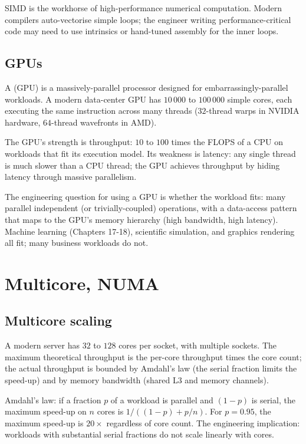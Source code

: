 SIMD is the workhorse of high-performance numerical computation. Modern compilers auto-vectorise simple loops; the engineer writing performance-critical code may need to use intrinsics or hand-tuned assembly for the inner loops.

\subsection{GPUs}

A  (GPU) is a massively-parallel processor designed for embarrassingly-parallel workloads. A modern data-center GPU has $10\,000$ to $100\,000$ simple cores, each executing the same instruction across many threads ($32$-thread warps in NVIDIA hardware, $64$-thread wavefronts in AMD).

The GPU's strength is throughput: $10$ to $100$ times the FLOPS of a CPU on workloads that fit its execution model. Its weakness is latency: any single thread is much slower than a CPU thread; the GPU achieves throughput by hiding latency through massive parallelism.

The engineering question for using a GPU is whether the workload fits: many parallel independent (or trivially-coupled) operations, with a data-access pattern that maps to the GPU's memory hierarchy (high bandwidth, high latency). Machine learning (Chapters 17-18), scientific simulation, and graphics rendering all fit; many business workloads do not.

\section{Multicore, NUMA}

\subsection{Multicore scaling}

A modern server has $32$ to $128$ cores per socket, with multiple sockets. The maximum theoretical throughput is the per-core throughput times the core count; the actual throughput is bounded by Amdahl's law (the serial fraction limits the speed-up) and by memory bandwidth (shared L3 and memory channels).

Amdahl's law: if a fraction $p$ of a workload is parallel and $(1-p)$ is serial, the maximum speed-up on $n$ cores is $1 / ((1-p) + p/n)$. For $p = 0.95$, the maximum speed-up is $20\times$ regardless of core count. The engineering implication: workloads with substantial serial fractions do not scale linearly with cores.

